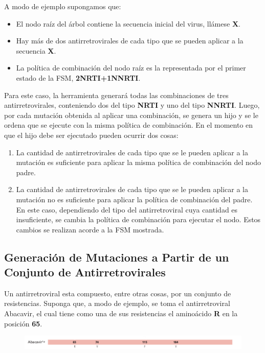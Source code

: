 A modo de ejemplo supongamos que:
\begin{itemize}
 \item  El nodo ra\'iz del \'arbol contiene la secuencia inicial del virus, ll\'amese \textbf{X}.
 \item  Hay m\'as de dos antirretrovirales de cada tipo que se pueden aplicar a la secuencia \textbf{X}.
 \item  La pol\'itica de combinaci\'on del nodo ra\'iz es la representada por el primer estado de la FSM, \textbf{2NRTI+1NNRTI}.
\end{itemize}
Para este caso, la herramienta generar\'a todas las combinaciones de tres antirretrovirales, conteniendo dos del tipo \textbf{NRTI} y uno del tipo
\textbf{NNRTI}. Luego, por cada mutaci\'on obtenida al aplicar una combinaci\'on, se genera un hijo y se le ordena que se ejecute con la misma 
pol\'itica de combinaci\'on. En el momento en que el hijo debe ser ejecutado pueden ocurrir dos cosas:
\begin{enumerate}
 \item La cantidad de antirretrovirales de cada tipo que se le pueden aplicar a la mutaci\'on es suficiente para aplicar la misma pol\'itica de
   combinaci\'on del nodo padre.
 \item La cantidad de antirretrovirales de cada tipo que se le pueden aplicar a la mutaci\'on no es suficiente para aplicar la pol\'itica de 
   combinaci\'on del padre. En este caso, dependiendo del tipo del antirretroviral cuya cantidad es insuficiente, se cambia la pol\'itica de
   combinaci\'on para ejecutar el nodo. Estos cambios se realizan acorde a la FSM mostrada.
\end{enumerate}

\subsection{Generaci\'on de Mutaciones a Partir de un Conjunto de Antirretrovirales}
Un antirretroviral esta compuesto, entre otras cosas, por un conjunto de resistencias. Suponga que, a modo de ejemplo, se toma el antirretroviral
Abacavir, el cual tiene como una de sus resistencias el amino\'acido \textbf{R} en la posici\'on \textbf{65}.

\begin{figure}[H]
  \includegraphics[width=\linewidth]{images/abacadir.png}
\end{figure}

